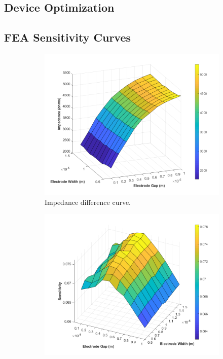 \subsection{Device Optimization}


\subsection*{FEA Sensitivity Curves}

\begin{figure}[h]
    \centering
    \begin{subfigure}[t]{0.49\textwidth}
        \centering
        \includegraphics[width=\textwidth]{images/comsol_simple_difference.png}
        \caption{Impedance difference curve.}
    \end{subfigure}
    \hfill
    \begin{subfigure}[t]{0.49\textwidth}
        \centering
        \includegraphics[width=\textwidth]{images/comsol_simple_sensitivity_surface.png}

\end{subfigure}
\end{figure}
